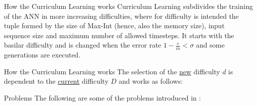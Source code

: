\documentclass[xcolor={usenames}]{beamer}
\begin{document}
  \begin{frame}{How the Curriculum Learning works}
  	Curriculum Learning subdivides the training of the ANN in more increasing difficulties, where for difficulty is intended the tuple formed by the size of Max-Int (hence, also the memory size), input sequence size and maximum number of allowed timesteps. It starts with the basilar difficulty and is changed when the error rate $1 - \frac{c}{m} < \sigma$ and some generations are executed.
  \end{frame}
  \begin{frame}{How the Curriculum Learning works}
  	The selection of the \underline{new} difficulty $d$ is dependent to the \underline{current} difficulty $D$ and works as follows:
  	\begin{itemize}
  	\end{itemize}
  \end{frame}
  \begin{frame}{Problems}
  	The following are some of the problems introduced in \cite{NRAM:2016}:
  	\begin{itemize}
  	\end{itemize}
  \end{frame}
\end{document}
